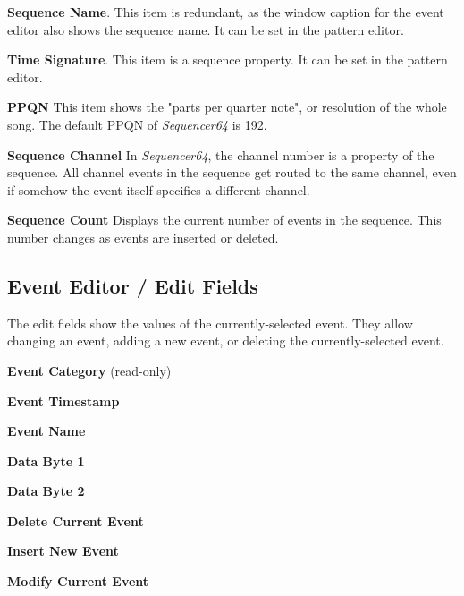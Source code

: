    \begin{enumber}
      \item \textbf{Sequence Name}.
         This item is redundant, as the window caption for the event editor
         also shows the sequence name.  It can be set in the pattern editor.
      \item \textbf{Time Signature}.
         This item is a sequence property.  It can be set in the pattern
         editor.
      \item \textbf{PPQN}
         This item shows the "parts per quarter note", or resolution of the
         whole song.  The default PPQN of \textsl{Sequencer64} is 192.
      \item \textbf{Sequence Channel}
         In \textsl{Sequencer64}, the channel number is a property of the
         sequence.  All channel events in the sequence get routed to the same
         channel, even if somehow the event itself specifies a different
         channel.
      \item \textbf{Sequence Count}
         Displays the current number of events in the sequence.
         This number changes as events are inserted or deleted.
   \end{enumber}

\subsection{Event Editor / Edit Fields}
\label{subsec:seq64_event_editor_fields}

   The edit fields show the values of the currently-selected event.  They allow
   changing an event, adding a new event, or deleting the currently-selected
   event.

   \begin{enumber}
      \item \textbf{Event Category} (read-only)
      \item \textbf{Event Timestamp}
      \item \textbf{Event Name}
      \item \textbf{Data Byte 1}
      \item \textbf{Data Byte 2}
      \item \textbf{Delete Current Event}
      \item \textbf{Insert New Event}
      \item \textbf{Modify Current Event}
   \end{enumber}

   \setcounter{ItemCounter}{0}      %

